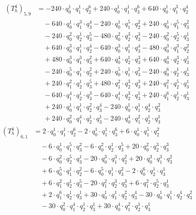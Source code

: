 \begin{align*}(T_{h}^4)_{5,9}&=-240\cdot q_0^{1}\cdot q_1^{1}\cdot q_2^{6}+240\cdot q_0^{1}\cdot q_1^{1}\cdot q_3^{6}+640\cdot q_0^{1}\cdot q_1^{3}\cdot q_2^{4}\\
&\quad -640\cdot q_0^{1}\cdot q_1^{3}\cdot q_3^{4}-240\cdot q_0^{1}\cdot q_1^{5}\cdot q_2^{2}+240\cdot q_0^{1}\cdot q_1^{5}\cdot q_3^{2}\\
&\quad -240\cdot q_0^{2}\cdot q_2^{1}\cdot q_3^{5}-480\cdot q_0^{2}\cdot q_2^{3}\cdot q_3^{3}-240\cdot q_0^{2}\cdot q_2^{5}\cdot q_3^{1}\\
&\quad +640\cdot q_0^{3}\cdot q_1^{1}\cdot q_2^{4}-640\cdot q_0^{3}\cdot q_1^{1}\cdot q_3^{4}-480\cdot q_0^{3}\cdot q_1^{3}\cdot q_2^{2}\\
&\quad +480\cdot q_0^{3}\cdot q_1^{3}\cdot q_3^{2}+640\cdot q_0^{4}\cdot q_2^{1}\cdot q_3^{3}+640\cdot q_0^{4}\cdot q_2^{3}\cdot q_3^{1}\\
&\quad -240\cdot q_0^{5}\cdot q_1^{1}\cdot q_2^{2}+240\cdot q_0^{5}\cdot q_1^{1}\cdot q_3^{2}-240\cdot q_0^{6}\cdot q_2^{1}\cdot q_3^{1}\\
&\quad +240\cdot q_1^{2}\cdot q_2^{1}\cdot q_3^{5}+480\cdot q_1^{2}\cdot q_2^{3}\cdot q_3^{3}+240\cdot q_1^{2}\cdot q_2^{5}\cdot q_3^{1}\\
&\quad -640\cdot q_1^{4}\cdot q_2^{1}\cdot q_3^{3}-640\cdot q_1^{4}\cdot q_2^{3}\cdot q_3^{1}+240\cdot q_1^{6}\cdot q_2^{1}\cdot q_3^{1}\\
&\quad +240\cdot q_0^{1}\cdot q_1^{1}\cdot q_2^{2}\cdot q_3^{4}-240\cdot q_0^{1}\cdot q_1^{1}\cdot q_2^{4}\cdot q_3^{2}\\
&\quad +240\cdot q_0^{2}\cdot q_1^{4}\cdot q_2^{1}\cdot q_3^{1}-240\cdot q_0^{4}\cdot q_1^{2}\cdot q_2^{1}\cdot q_3^{1}\end{align*}
\begin{align*}(T_{h}^4)_{6,1}&=2\cdot q_0^{1}\cdot q_1^{1}\cdot q_2^{6}-2\cdot q_0^{1}\cdot q_1^{1}\cdot q_3^{6}+6\cdot q_0^{1}\cdot q_1^{5}\cdot q_2^{2}\\
&\quad -6\cdot q_0^{1}\cdot q_1^{5}\cdot q_3^{2}-6\cdot q_0^{2}\cdot q_2^{1}\cdot q_3^{5}+20\cdot q_0^{2}\cdot q_2^{3}\cdot q_3^{3}\\
&\quad -6\cdot q_0^{2}\cdot q_2^{5}\cdot q_3^{1}-20\cdot q_0^{3}\cdot q_1^{3}\cdot q_2^{2}+20\cdot q_0^{3}\cdot q_1^{3}\cdot q_3^{2}\\
&\quad +6\cdot q_0^{5}\cdot q_1^{1}\cdot q_2^{2}-6\cdot q_0^{5}\cdot q_1^{1}\cdot q_3^{2}-2\cdot q_0^{6}\cdot q_2^{1}\cdot q_3^{1}\\
&\quad +6\cdot q_1^{2}\cdot q_2^{1}\cdot q_3^{5}-20\cdot q_1^{2}\cdot q_2^{3}\cdot q_3^{3}+6\cdot q_1^{2}\cdot q_2^{5}\cdot q_3^{1}\\
&\quad +2\cdot q_1^{6}\cdot q_2^{1}\cdot q_3^{1}+30\cdot q_0^{1}\cdot q_1^{1}\cdot q_2^{2}\cdot q_3^{4}-30\cdot q_0^{1}\cdot q_1^{1}\cdot q_2^{4}\cdot q_3^{2}\\
&\quad -30\cdot q_0^{2}\cdot q_1^{4}\cdot q_2^{1}\cdot q_3^{1}+30\cdot q_0^{4}\cdot q_1^{2}\cdot q_2^{1}\cdot q_3^{1}\end{align*}
